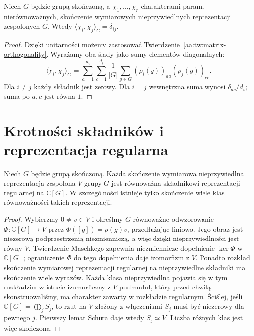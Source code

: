 \begin{wniosek}
\label{aa:cor:character-orthogonality}
Niech \(G\) będzie grupą skończoną, a
\(\chi_1,\ldots,\chi_r\) charakterami parami
nierównoważnych, skończenie wymiarowych
nieprzywiedlnych reprezentacji zespolonych \(G\).
Wtedy \(\langle\chi_i,\chi_j\rangle_G=\delta_{ij}\).
\end{wniosek}
\begin{proof}
Dzięki unitarności możemy zastosować
Twierdzenie~\ref{aa:tw:matrix-orthogonality}.
Wyrażamy oba ślady jako sumy elementów diagonalnych:
\[
\langle\chi_i,\chi_j\rangle_G
=\sum_{a=1}^{d_i}\sum_{c=1}^{d_j}
\frac1{|G|}\sum_{g\in G}
(\rho_i(g))_{aa}\overline{(\rho_j(g))_{cc}}.
\]
Dla \(i\ne j\) każdy składnik jest zerowy.
Dla \(i=j\) wewnętrzna suma wynosi
\(\delta_{ac}/d_i\); suma po \(a,c\) jest równa \(1\).
\end{proof}

\section{Krotności składników i reprezentacja regularna}
\begin{stwierdzenie}
\label{aa:prop:regular-contains-all}
Niech \(G\) będzie grupą skończoną.
Każda skończenie wymiarowa nieprzywiedlna reprezentacja
zespolona \(V\) grupy \(G\) jest równoważna składnikowi
reprezentacji regularnej na \(\mathbb C[G]\).
W szczególności istnieje tylko skończenie wiele klas
równoważności takich reprezentacji.
\end{stwierdzenie}
\begin{proof}
Wybierzmy \(0\ne v\in V\) i określmy
\(G\)-równoważne odwzorowanie
\(\Phi:\mathbb C[G]\to V\) przez
\(\Phi([g])=\rho(g)v\), przedłużając liniowo.
Jego obraz jest niezerową podprzestrzenią niezmienniczą,
a więc dzięki nieprzywiedlności jest równy \(V\).
Twierdzenie Maschkego zapewnia niezmiennicze dopełnienie
\(\ker\Phi\) w \(\mathbb C[G]\); ograniczenie \(\Phi\)
do tego dopełnienia daje izomorfizm z \(V\).
Ponadto rozkład skończenie wymiarowej reprezentacji
regularnej na nieprzywiedlne składniki ma skończenie
wiele wyrazów. Każda klasa nieprzywiedlna pojawia
się w tym rozkładzie: w istocie izomorficzny z \(V\)
podmoduł, który przed chwilą skonstruowaliśmy,
ma charakter zawarty w rozkładzie regularnym.
Ściślej, jeśli \(\mathbb C[G]=\bigoplus_j S_j\),
to rzut na \(V\) złożony z włączeniami \(S_j\)
musi być niezerowy dla pewnego \(j\). Pierwszy
lemat Schura daje wtedy \(S_j\simeq V\).
Liczba różnych klas jest więc skończona.
\end{proof}

